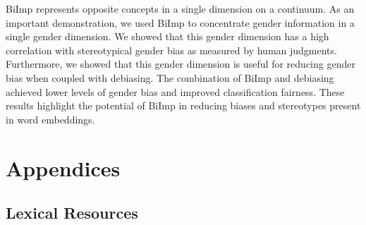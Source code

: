\documentclass[11pt,a4paper]{article}
\def\proposedmethod{BiImp}
\begin{document}


\proposedmethod{} represents opposite concepts in a single
dimension on a continuum. As an important demonstration, we
used \proposedmethod{} to concentrate gender information in
a single gender dimension.  We showed that this gender
dimension has a high correlation with stereotypical gender
bias as measured by human judgments. Furthermore, we showed
that this gender dimension is useful for reducing gender
bias when coupled with debiasing.  The combination of
\proposedmethod{} and debiasing achieved lower levels of
gender bias and improved classification fairness. These
results highlight the potential of \proposedmethod{} in
reducing biases and stereotypes present in word embeddings.






\clearpage

\appendix

\section{Appendices}



\subsection{Lexical Resources} 
\label{app:lexical_resources}
\end{document}
